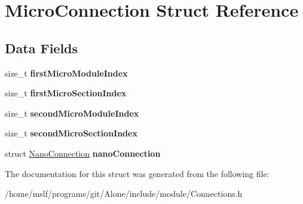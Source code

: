 \hypertarget{struct_micro_connection}{}\section{Micro\+Connection Struct Reference}
\label{struct_micro_connection}
\subsection*{Data Fields}
\begin{DoxyCompactItemize}
\item 
\hypertarget{struct_micro_connection_abefb60f42261bfee9475d09ce4a1c1ae}{}\label{struct_micro_connection_abefb60f42261bfee9475d09ce4a1c1ae} 
size\+\_\+t {\bfseries first\+Micro\+Module\+Index}
\item 
\hypertarget{struct_micro_connection_a90529e4335360f228c110ad6aca89708}{}\label{struct_micro_connection_a90529e4335360f228c110ad6aca89708} 
size\+\_\+t {\bfseries first\+Micro\+Section\+Index}
\item 
\hypertarget{struct_micro_connection_ab641c9bc0121061efc97aec4093f364c}{}\label{struct_micro_connection_ab641c9bc0121061efc97aec4093f364c} 
size\+\_\+t {\bfseries second\+Micro\+Module\+Index}
\item 
\hypertarget{struct_micro_connection_add9abee9bec1f3995e99259987fe25d7}{}\label{struct_micro_connection_add9abee9bec1f3995e99259987fe25d7} 
size\+\_\+t {\bfseries second\+Micro\+Section\+Index}
\item 
\hypertarget{struct_micro_connection_a5a4f92d0a490a4299ca674ca0527836b}{}\label{struct_micro_connection_a5a4f92d0a490a4299ca674ca0527836b} 
struct \hyperlink{struct_nano_connection}{Nano\+Connection} {\bfseries nano\+Connection}
\end{DoxyCompactItemize}


The documentation for this struct was generated from the following file\+:\begin{DoxyCompactItemize}
\item 
/home/mslf/programs/git/\+Alone/include/module/Connections.\+h\end{DoxyCompactItemize}
